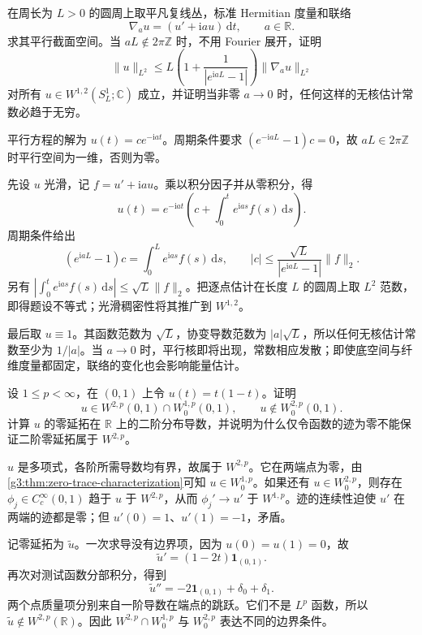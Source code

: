 \begin{exercise}\label{g3:ex:circle-connection-poincare}
	在周长为 \(L>0\) 的圆周上取平凡复线丛，标准 Hermitian 度量和联络
	\[
		\nabla_a u=(u'+\mathrm iau)\,\mathrm dt,\qquad a\in\mathbb R.
	\]
	求其平行截面空间。当 \(aL\notin2\pi\mathbb Z\) 时，不用 Fourier 展开，证明
	\[
		\|u\|_{L^2}\le L\left(1+\frac1{|e^{\mathrm iaL}-1|}\right)\|\nabla_a u\|_{L^2}
	\]
	对所有 \(u\in W^{1,2}(S^1_L;\mathbb C)\) 成立，并证明当非零 \(a\to0\) 时，任何这样的无核估计常数必趋于无穷。
\end{exercise}
\begin{solution}
	平行方程的解为 \(u(t)=ce^{-\mathrm iat}\)。周期条件要求 \((e^{-\mathrm iaL}-1)c=0\)，故 \(aL\in2\pi\mathbb Z\) 时平行空间为一维，否则为零。

	先设 \(u\) 光滑，记 \(f=u'+\mathrm iau\)。乘以积分因子并从零积分，得
	\[
		u(t)=e^{-\mathrm iat}\left(c+\int_0^te^{\mathrm ias}f(s)\,\mathrm ds\right).
	\]
	周期条件给出
	\[
		(e^{\mathrm iaL}-1)c=\int_0^Le^{\mathrm ias}f(s)\,\mathrm ds,
		\qquad |c|\le\frac{\sqrt L}{|e^{\mathrm iaL}-1|}\|f\|_2.
	\]
	另有 \(\left|\int_0^te^{\mathrm ias}f(s)\,\mathrm ds\right|\le\sqrt L\|f\|_2\)。把逐点估计在长度 \(L\) 的圆周上取 \(L^2\) 范数，即得题设不等式；光滑稠密性将其推广到 \(W^{1,2}\)。

	最后取 \(u\equiv1\)。其函数范数为 \(\sqrt L\)，协变导数范数为 \(|a|\sqrt L\)，所以任何无核估计常数至少为 \(1/|a|\)。当 \(a\to0\) 时，平行核即将出现，常数相应发散；即使底空间与纤维度量都固定，联络的变化也会影响能量估计。
\end{solution}

\begin{exercise}\label{g3:ex:zero-trace-second-order}
	设 \(1\le p<\infty\)，在 \((0,1)\) 上令 \(u(t)=t(1-t)\)。证明
	\[
		u\in W^{2,p}(0,1)\cap W_0^{1,p}(0,1),
		\qquad u\notin W_0^{2,p}(0,1).
	\]
	计算 \(u\) 的零延拓在 \(\mathbb R\) 上的二阶分布导数，并说明为什么仅令函数的迹为零不能保证二阶零延拓属于 \(W^{2,p}\)。
\end{exercise}
\begin{solution}
	\(u\) 是多项式，各阶所需导数均有界，故属于 \(W^{2,p}\)。它在两端点为零，由\cref{g3:thm:zero-trace-characterization}可知 \(u\in W_0^{1,p}\)。如果还有 \(u\in W_0^{2,p}\)，则存在 \(\phi_j\in C_c^\infty(0,1)\) 趋于 \(u\) 于 \(W^{2,p}\)，从而 \(\phi_j'\to u'\) 于 \(W^{1,p}\)。迹的连续性迫使 \(u'\) 在两端的迹都是零；但 \(u'(0)=1\)、\(u'(1)=-1\)，矛盾。

	记零延拓为 \(\widetilde u\)。一次求导没有边界项，因为 \(u(0)=u(1)=0\)，故
	\[
		\widetilde u'=(1-2t)\mathbf1_{(0,1)}.
	\]
	再次对测试函数分部积分，得到
	\[
		\widetilde u''=-2\mathbf1_{(0,1)}+\delta_0+\delta_1.
	\]
	两个点质量项分别来自一阶导数在端点的跳跃。它们不是 \(L^p\) 函数，所以 \(\widetilde u\notin W^{2,p}(\mathbb R)\)。因此 \(W^{2,p}\cap W_0^{1,p}\) 与 \(W_0^{2,p}\) 表达不同的边界条件。
\end{solution}

